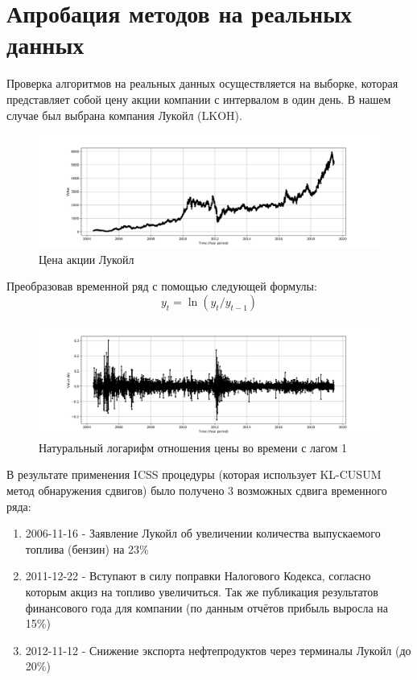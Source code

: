 \documentclass[a4paper,14pt,russian]{extarticle}
\begin{document}
	\section{\label{sec:sec3}Апробация методов на реальных данных}
	Проверка алгоритмов на реальных данных осуществляется на выборке, которая представляет собой цену акции компании с интервалом в один день. В нашем случае был выбрана компания Лукойл (LKOH).
	\begin{figure}[H]
		\includegraphics[width=\linewidth]{source_ts_LKOH.png}
		\caption{\label{fig:fig1} Цена акции Лукойл}
	\end{figure}
	Преобразовав временной ряд с помощью следующей формулы:
	\begin{equation}
		y_t = \ln(y_t / y_{t-1})
	\end{equation}
	\begin{figure}[H]
		\includegraphics[width=\linewidth]{source_ln_ts_LKOH.png}
		\caption{\label{fig:fig2} Натуральный логарифм отношения цены во времени с лагом 1}
	\end{figure}
	В результате применения ICSS процедуры (которая использует KL-CUSUM метод обнаружения сдвигов) было получено 3 возможных сдвига временного ряда:
	\begin{enumerate}
		\item 2006-11-16 - Заявление Лукойл об увеличении количества выпускаемого топлива (бензин) на 23\%
		\item 2011-12-22 - Вступают в силу поправки Налогового Кодекса, согласно которым акциз на топливо увеличиться. Так же публикация результатов финансового года для компании (по данным отчётов прибыль выросла на 15\%)
		\item 2012-11-12 - Снижение экспорта нефтепродуктов через терминалы Лукойл (до 20\%)
	\end{enumerate}
\end{document}
